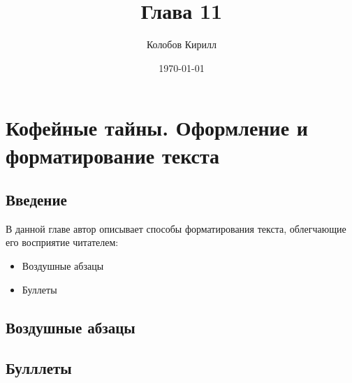 \documentclass[a4paper,12pt]{report}
\author{Колобов Кирилл}
\title{Глава 11}
\date{\today}
\begin{document}
\setcounter{chapter}{10}

\chapter{Кофейные тайны. Оформление и форматирование текста}
\section{Введение}
В данной главе автор описывает способы форматирования текста, 
облегчающие его восприятие читателем: 
\begin{itemize}
\item{Воздушные абзацы}
\item{Буллеты}
\end{itemize}

\section{Воздушные абзацы}\label{p1}

\section{Булллеты}\label{p2}

\tableofcontents
\end{document}
